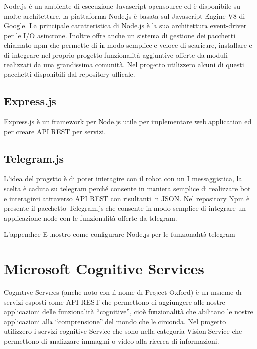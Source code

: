 Node.js è un ambiente di esecuzione Javascript  opensource ed è disponibile su molte architetture, la piattaforma Node.js è basata sul Javascript Engine V8 di Google.
La principale caratteristica di Node.js è la sua  architettura event-driver per le I/O asincrone.
Inoltre offre anche un sistema di gestione dei pacchetti chiamato npm che permette di  in modo semplice e veloce di scaricare, installare e di integrare nel proprio progetto funzionalità aggiuntive offerte da moduli realizzati da una grandissima comunità.
Nel progetto utilizzero alcuni di questi pacchetti disponibili dal repository ufficale.


\subsection{Express.js}
Express.js è un framework per Node.js utile per implementare web application ed per creare API REST per servizi. 
\subsection{Telegram.js}
L’idea del progetto è di poter interagire con il robot con un I messaggistica, la scelta è caduta su telegram perché consente in maniera semplice di realizzare bot e interagirci attraverso API REST con risultanti in JSON. Nel repository Npm è presente il pacchetto Telegram.js che consente in modo semplice di integrare un applicazione node con le funzionalità offerte da telegram.

L'appendice E mostro come configurare Node.js per le funzionalità telegram

\section{Microsoft Cognitive Services} 
Cognitive Services (anche noto con il nome di Project Oxford) è un insieme di servizi esposti come API REST che permettono di aggiungere alle nostre applicazioni delle funzionalità “cognitive”, cioè funzionalità che abilitano le nostre applicazioni alla “comprensione” del mondo che le circonda. Nel progetto utilizzero i servizi cognitive Service che sono nella categoria Vision Service  che permettono di analizzare immagini o video alla ricerca di informazioni. 



